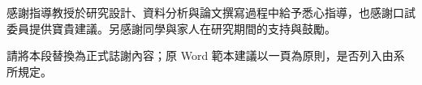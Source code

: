 \begin{acknowledgements}
感謝指導教授於研究設計、資料分析與論文撰寫過程中給予悉心指導，也感謝口試委員提供寶貴建議。另感謝同學與家人在研究期間的支持與鼓勵。

請將本段替換為正式誌謝內容；原 Word 範本建議以一頁為原則，是否列入由系所規定。

\acknowledgementsignature
\end{acknowledgements}
